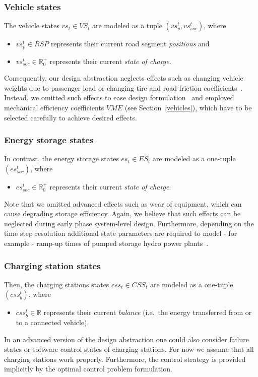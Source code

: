 \subsubsection{Vehicle states}
\label{states_vehicles}

The vehicle states $vs_t \in VS_t$ are modeled as a tuple $(vs_p^t, vs_{soc}^t)$, where
\begin{itemize}
	\item $vs_p^t \in RSP$ represents their current road segment \textit{positions} and
	\item $vs_{soc}^t \in \mathbb{R}_0^+$ represents their current \textit{state of charge}.
\end{itemize}
Consequently, our design abstraction neglects effects such as changing vehicle weights due to passenger load or changing tire and road friction coefficients~\cite{imine2006road}.
Instead, we omitted such effects to ease design formulation~\cite{gao2007modeling} and employed mechanical efficiency coefficients $VME$ (see Section~\ref{vehicles}), which have to be selected carefully to achieve desired effects.

\subsubsection{Energy storage states}
\label{states_storages}

In contrast, the energy storage states $es_t \in ES_t$ are modeled as a one-tuple $(es_{soc}^t)$, where
\begin{itemize}
	\item $es_{soc}^t \in \mathbb{R}_0^+$ represents their current \textit{state of charge}. 
\end{itemize}
Note that we omitted advanced effects such as wear of equipment, 
which can cause degrading storage efficiency. Again, we believe that such effects can be neglected during early phase system-level design. Furthermore, depending on the time step resolution additional state parameters are required to model - for example - ramp-up times of pumped storage hydro power plants~\cite{Garcia2008}.

\subsubsection{Charging station states}
\label{states_stations}

Then, the charging stations states $css_t \in CSS_t$ are modeled as a one-tuple $(css_b^t)$, where
\begin{itemize}
	\item $css_b^t \in \mathbb{R}$ represents their current \textit{balance} (i.e.\ the energy transferred from or to a connected vehicle).
\end{itemize}
In an advanced version of the design abstraction one could also consider failure states or software control states of charging stations. For now we assume that all charging stations work properly. Furthermore, the control strategy is provided implicitly by the optimal control problem formulation.

